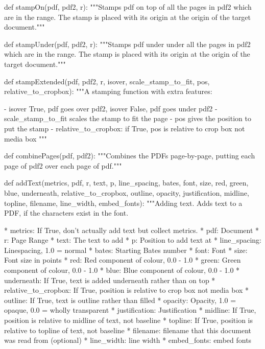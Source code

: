 def stampOn(pdf, pdf2, r):
    """Stamps pdf on top of all the pages in pdf2 which are in the range. The
    stamp is placed with its origin at the origin of the target document."""

def stampUnder(pdf, pdf2, r):
    """Stamps pdf under under all the pages in pdf2 which are in the range. The
    stamp is placed with its origin at the origin of the target document."""

def stampExtended(pdf, pdf2, r, isover, scale_stamp_to_fit, pos,
                  relative_to_cropbox):
    """A stamping function with extra features:

     - isover True, pdf goes over pdf2, isover False, pdf goes under pdf2
     - scale_stamp_to_fit scales the stamp to fit the page
     - pos gives the position to put the stamp
     - relative_to_cropbox: if True, pos is relative to crop box not media box
    """

def combinePages(pdf, pdf2):
    """Combines the PDFs page-by-page, putting each page of pdf2 over each page
    of pdf."""

def addText(metrics, pdf, r, text, p, line_spacing, bates, font, size, red,
            green, blue, underneath, relative_to_cropbox, outline, opacity,
            justification, midline, topline, filename, line_width,
            embed_fonts):
    """Adding text. Adds text to a PDF, if the characters exist in the font.

         * metrics: If True, don't actually add text but collect metrics.
         * pdf:	Document
         * r: Page Range
         * text: The text to add
         * p: Position to add text at
         * line_spacing: Linespacing, 1.0 = normal
         * bates: Starting Bates number
         * font: Font
         * size: Font size in points
         * red: Red component of colour, 0.0 - 1.0
         * green: Green component of colour, 0.0 - 1.0
         * blue: Blue component of colour, 0.0 - 1.0
         * underneath: If True, text is added underneath rather than on top
         * relative_to_cropbox: If True, position is relative to crop box not
           media box
         * outline: If True, text is outline rather than filled
         * opacity: Opacity, 1.0 = opaque, 0.0 = wholly transparent
         * justification: Justification
         * midline: If True, position is relative to midline of text, not
           baseline
         * topline: If True, position is relative to topline of text, not
           baseline
         * filename: filename that this document was read from (optional)
         * line_width: line width
         * embed_fonts: embed fonts

